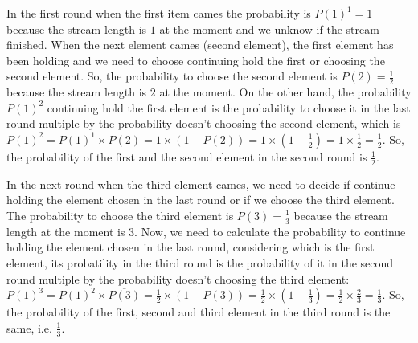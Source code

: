 In the first round when the first item cames the probability is $P(1)^{1}=1$ because
the stream length is $1$ at the moment and we unknow if the stream finished. When
the next element cames (second element), the first element has been holding and
we need to choose continuing hold the first or choosing the second element. So,
the probability to choose the second element is $P(2)=\frac{1}{2}$ because the stream length
is $2$ at the moment. On the other hand, the probability $P(1)^{2}$ continuing hold the
first element is the probability to choose it in the last round multiple by the
probability doesn't choosing the second element, which is $P(1)^{2}=P(1)^{1} \times \overline{P(2)} = 1 \times \left(1-P(2)\right) = 1 \times \left(1 - \frac{1}{2}\right) = 1 \times \frac{1}{2} = \frac{1}{2}$.
So, the probability of the first and the second element in the second round is $\frac{1}{2}$.

In the next round when the third element cames, we need to decide if continue holding
the element chosen in the last round or if we choose the third element. The probability
to choose the third element is $P(3) = \frac{1}{3}$ because the stream length at the moment
is 3. Now, we need to calculate the probability to continue holding the element
chosen in the last round, considering which is the first element, its probatility
in the third round is the probability of it in the second round multiple
by the probability doesn't choosing the third element: $P(1)^{3}=P(1)^{2}\times\overline{P(3)} = \frac{1}{2} \times \left(1-P(3)\right) = \frac{1}{2} \times \left(1 - \frac{1}{3}\right) = \frac{1}{2} \times \frac{2}{3} = \frac{1}{3}$.
So, the probability of the first, second and third element in the third round is
the same, i.e. $\frac{1}{3}$.

